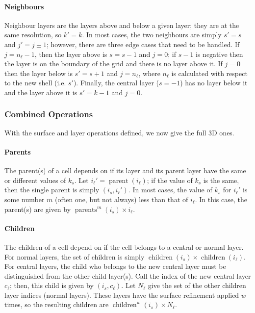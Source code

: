 \paragraph{Neighbours}
Neighbour layers are the layers above and below a given layer; they are at the same resolution, so $k' = k$.
In most cases, the two neighbours are simply $s' = s$ and $j' = j \pm 1$; however, there are three edge cases that need to be handled.
If $j = n_\ell - 1$, then the layer above is $s = s - 1$ and $j = 0$; if $s - 1$ is negative then the layer is on the boundary of the grid and there is no layer above it.
If $j = 0$ then the layer below is $s' = s + 1$ and $j = n_\ell$, where $n_\ell$ is calculated with respect to the new shell (i.e. $s'$).
Finally, the central layer ($s = -1$) has no layer below it and the layer above it is $s' = k - 1$ and $j = 0$.


\subsubsection{Combined Operations}
With the surface and layer operations defined, we now give the full 3D ones.


\paragraph{Parents}
The parent(s) of a cell depends on if its layer and its parent layer have the same or different values of $k_s$.
Let $i_\ell' = \operatorname{parent}(i_\ell)$; if the value of $k_s$ is the same, then the single parent is simply $(i_s, i_\ell')$.
In most cases, the value of $k_s$ for $i_\ell'$ is some number $m$ (often one, but not always) less than that of $i_\ell$.
In this case, the parent(s) are given by $\operatorname{parents}^m(i_s) \times i_\ell$.


\paragraph{Children}
The children of a cell depend on if the cell belongs to a central or normal layer.
For normal layers, the set of children is simply $\operatorname{children}(i_s) \times \operatorname{children}(i_\ell)$.
For central layers, the child who belongs to the new central layer must be distinguished from the other child layer(s).
Call the index of the new central layer $c_\ell$; then, this child is given by $(i_s, c_\ell)$.
Let $ N_\ell$ give the set of the other children layer indices (normal layers).
These layers have the surface refinement applied $w$ times, so the resulting children are $\operatorname{children}^w(i_s) \times N_\ell$.


